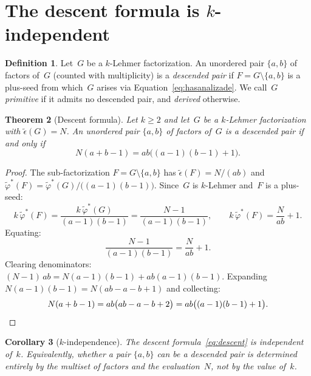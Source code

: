 \documentclass[11pt]{article}
\newtheorem{theorem}{Theorem}
\newtheorem{corollary}[theorem]{Corollary}
\theoremstyle{definition}
\newtheorem{definition}[theorem]{Definition}
\theoremstyle{remark}
\newcommand{\eps}{\tilde{\epsilon}}
\newcommand{\phist}{\tilde{\varphi}^*}
\begin{document}
\section{The descent formula is $k$-independent}

\begin{definition}\label{def:descent}
Let~$G$ be a $k$-Lehmer factorization.  An unordered pair $\{a, b\}$ of
factors of~$G$ (counted with multiplicity) is a \emph{descended pair} if
$F = G \setminus \{a, b\}$ is a plus-seed from which~$G$ arises via
Equation~\eqref{eq:hasanalizade}.  We call~$G$ \emph{primitive} if
it admits no descended pair, and \emph{derived} otherwise.
\end{definition}

\begin{theorem}[Descent formula]\label{thm:descent-formula}
Let $k \ge 2$ and let~$G$ be a $k$-Lehmer factorization with
$\eps(G) = N$.  An unordered pair $\{a, b\}$ of factors of~$G$ is a
descended pair if and only if
\begin{equation}\label{eq:descent}
  N(a + b - 1) = ab\bigl((a-1)(b-1) + 1\bigr).
\end{equation}
\end{theorem}

\begin{proof}
The sub-factorization $F = G \setminus \{a, b\}$ has
$\eps(F) = N/(ab)$ and $\phist(F) = \phist(G)/\bigl((a-1)(b-1)\bigr)$.
Since~$G$ is $k$-Lehmer and~$F$ is a plus-seed:
\[
  k\,\phist(F) = \frac{k\,\phist(G)}{(a-1)(b-1)} = \frac{N-1}{(a-1)(b-1)},
  \qquad
  k\,\phist(F) = \frac{N}{ab} + 1.
\]
Equating:
\begin{equation}\label{eq:k-cancels}
  \frac{N - 1}{(a-1)(b-1)} = \frac{N}{ab} + 1.
\end{equation}
Clearing denominators: $(N-1)\,ab = N(a-1)(b-1) + ab(a-1)(b-1)$.
Expanding $N(a-1)(b-1) = N(ab - a - b + 1)$ and collecting:
\[
  N(a + b - 1) = ab\bigl(ab - a - b + 2\bigr) = ab\bigl((a-1)(b-1)+1\bigr).
  \qedhere
\]
\end{proof}

\begin{corollary}[$k$-independence]\label{cor:k-free}
The descent formula~\eqref{eq:descent} is independent of~$k$.
Equivalently, whether a pair $\{a,b\}$ can be a descended pair is
determined entirely by the multiset of factors and the evaluation~$N$, not
by the value of~$k$.
\end{corollary}
\end{document}
